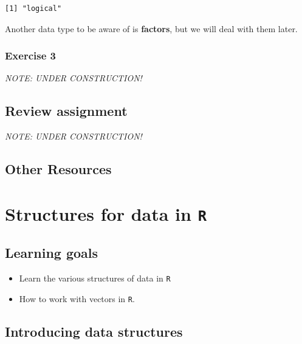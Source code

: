 \documentclass[
]{book}
\providecommand{\tightlist}{%
  \setlength{\itemsep}{0pt}\setlength{\parskip}{0pt}}
\begin{document}
\begin{verbatim}
[1] "logical"
\end{verbatim}

Another data type to be aware of is \textbf{factors}, but we will deal with them later.

\hypertarget{exercise-3-1}{%
\subsection*{Exercise 3}\label{exercise-3-1}}

\emph{NOTE: UNDER CONSTRUCTION!}

\hypertarget{review-assignment-2}{%
\section*{Review assignment}\label{review-assignment-2}}

\emph{NOTE: UNDER CONSTRUCTION!}

\hypertarget{other-resources-2}{%
\section*{Other Resources}\label{other-resources-2}}

\hypertarget{structures-for-data-in-r}{%
\chapter{\texorpdfstring{Structures for data in \texttt{R}}{Structures for data in R}}\label{structures-for-data-in-r}}

\hypertarget{learning-goals-3}{%
\section*{Learning goals}\label{learning-goals-3}}

\begin{itemize}
\tightlist
\item
  Learn the various structures of data in \texttt{R}\\
\item
  How to work with vectors in \texttt{R}.
\end{itemize}

\hypertarget{introducing-data-structures}{%
\section*{Introducing data structures}\label{introducing-data-structures}}
\end{document}
